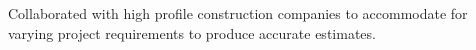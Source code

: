 \begin{cventries}
{\begin{cvitems}
             \vspace{1mm}
        \item {Collaborated with high profile construction companies to accommodate for varying project requirements to produce accurate estimates.}
      \end{cvitems}
    }

    
\end{cventries}
